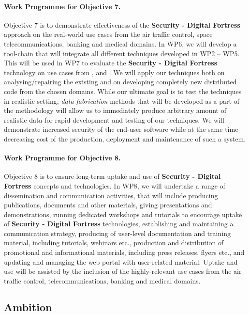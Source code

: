 \documentclass[a4paper,11pt]{article}
\newcommand{\project}[1]{\textbf{#1}\xspace}
\newcommand{\SECURITY}{\project{Security - Digital Fortress}}
\newcommand{\TheProject}{\SECURITY}
\begin{document}
\paragraph{Work Programme for Objective 7.} 

Objective 7 is to demonstrate effectiveness of the \TheProject{} approach on the real-world use cases from the air traffic control, space telecommunications, banking and medical domains. In WP6, we will develop a tool-chain that will integrate all different techniques developed in WP2 -- WP5. This will be used in WP7 to evaluate the \TheProject{} technology  on use cases from \SOPRAshort{}, \FRQshort{} and \DEMshort{}. We will apply our techniques both on analysing/repairing the existing and on developing completely new distributed code from the chosen domains. While our ultimate goal is to test the techniques in realistic setting, \emph{data fabrication} methods that will be developed as a part of the methodology will allow us to immediately produce arbitrary amount of realistic data for rapid development and testing of our techniques. We will demonstrate increased security of the end-user software while at the same time decreasing cost of the production, deployment and maintenance of such a system.

\paragraph{Work Programme for Objective 8.}

Objective 8 is to ensure long-term uptake and use of \TheProject{} concepts and technologies. In WP8, we will undertake a range of dissemination and communication activities, that will include producing publications, documents and other materials, giving presentations and demonstrations, running dedicated workshops and tutorials to encourage uptake of \TheProject{} technologies, establishing and maintaining a communication strategy, producing of user-level documentation and training material, including tutorials, webinars etc., production and distribution of promotional and informational materials, including press releases, flyers etc., and updating and managing the web portal with user-related material. Uptake and use will be assisted by the inclusion of the highly-relevant use cases from the air traffic control, telecommunications, banking and medical domains.


\subsection{Ambition}
\end{document}
